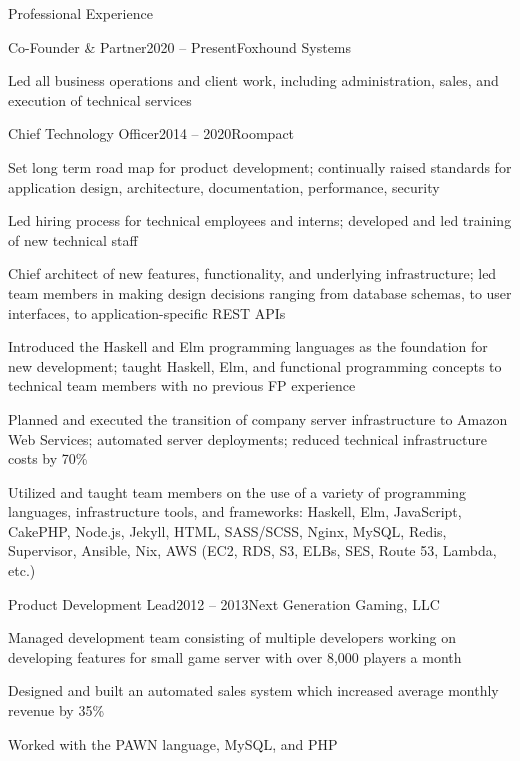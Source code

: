 \documentclass{resume} %
\begin{document}

\begin{rSection}{Professional Experience}

\begin{rSubsection}{Co-Founder \& Partner}{2020 -- Present}{Foxhound Systems}{}
  \item Led all business operations and client work, including administration, sales, and execution of technical services
\end{rSubsection}


\begin{rSubsection}{Chief Technology Officer}{2014 -- 2020}{Roompact}{}
  \item Set long term road map for product development; continually raised standards for application design, architecture, documentation, performance, security
  \item Led hiring process for technical employees and interns; developed and led training of new technical staff
  \item Chief architect of new features, functionality, and underlying infrastructure; led team members in making design decisions ranging from database schemas,  to user interfaces, to application-specific REST APIs
  \item Introduced the Haskell and Elm programming languages as the foundation for new development; taught Haskell, Elm, and functional programming concepts to technical team members with no previous FP experience
  \item Planned and executed the transition of company server infrastructure to Amazon Web Services; automated server deployments; reduced technical infrastructure costs by 70\%
  \item Utilized and taught team members on the use of a variety of programming languages, infrastructure tools, and frameworks: Haskell, Elm, JavaScript, CakePHP, Node.js, Jekyll, HTML, SASS/SCSS, Nginx, MySQL, Redis, Supervisor, Ansible, Nix, AWS (EC2, RDS, S3, ELBs, SES, Route 53, Lambda, etc.)
\end{rSubsection}


\begin{rSubsection}{Product Development Lead}{2012 -- 2013}{Next Generation Gaming, LLC}{}
  \item Managed development team consisting of multiple developers working on developing features for small game server with over 8,000 players a month
  \item Designed and built an automated sales system which increased average monthly revenue by 35\%
  \item Worked with the PAWN language, MySQL, and PHP
\end{rSubsection}


\end{rSection}
\end{document}
